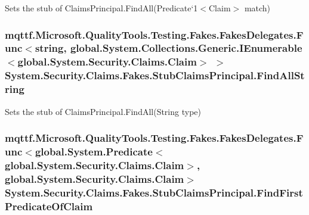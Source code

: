 Sets the stub of Claims\-Principal.\-Find\-All(Predicate`1$<$Claim$>$ match)

\hypertarget{class_system_1_1_security_1_1_claims_1_1_fakes_1_1_stub_claims_principal_ad4723118d4b0771e1157ee0c5c02a848}{
\subsubsection[{Find\-All\-String}]{\setlength{\rightskip}{0pt plus 5cm}mqttf.\-Microsoft.\-Quality\-Tools.\-Testing.\-Fakes.\-Fakes\-Delegates.\-Func$<$string, global.\-System.\-Collections.\-Generic.\-I\-Enumerable$<$global.\-System.\-Security.\-Claims.\-Claim$>$ $>$ System.\-Security.\-Claims.\-Fakes.\-Stub\-Claims\-Principal.\-Find\-All\-String}}\label{class_system_1_1_security_1_1_claims_1_1_fakes_1_1_stub_claims_principal_ad4723118d4b0771e1157ee0c5c02a848}


Sets the stub of Claims\-Principal.\-Find\-All(\-String type)

\hypertarget{class_system_1_1_security_1_1_claims_1_1_fakes_1_1_stub_claims_principal_acc61ec0377e5470a3bbcac8bb61492a7}{
\subsubsection[{Find\-First\-Predicate\-Of\-Claim}]{\setlength{\rightskip}{0pt plus 5cm}mqttf.\-Microsoft.\-Quality\-Tools.\-Testing.\-Fakes.\-Fakes\-Delegates.\-Func$<$global.\-System.\-Predicate$<$global.\-System.\-Security.\-Claims.\-Claim$>$, global.\-System.\-Security.\-Claims.\-Claim$>$ System.\-Security.\-Claims.\-Fakes.\-Stub\-Claims\-Principal.\-Find\-First\-Predicate\-Of\-Claim}}\label{class_system_1_1_security_1_1_claims_1_1_fakes_1_1_stub_claims_principal_acc61ec0377e5470a3bbcac8bb61492a7}


